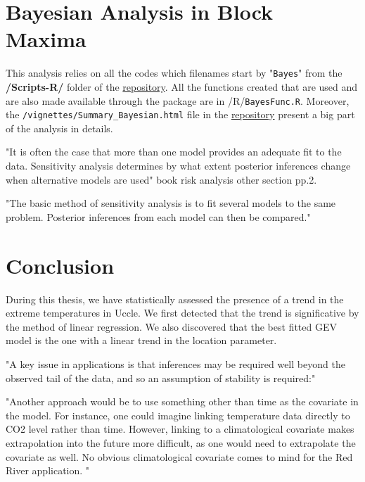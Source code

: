 \documentclass[11pt,a4paper,openany, twosided]{book}
\begin{document}
\chapter{Bayesian Analysis in Block Maxima}\label{sec:anabayes}
\minitoc \thispagestyle{empty}
 \vspace{1cm}

This analysis relies on all the codes which filenames start by "\texttt{Bayes}" from the \textbf{/Scripts-R/} folder of the \href{https://github.com/proto4426/PissoortThesis/}{repository}. All the functions created that are used and are also made available through the package are in /R/\texttt{BayesFunc.R}. Moreover,
the \texttt{/vignettes/Summary\_Bayesian.html} file in the \href{https://github.com/proto4426/PissoortThesis/}{repository} present a big part of the analysis in details.

"It is often the case that more than one model provides an adequate fit to the data. Sensitivity analysis determines by what extent posterior inferences change when alternative
models are used"   book risk analysis other section pp.2.

"The basic method of sensitivity analysis is to fit several models to
the same problem. Posterior inferences from each model can then be compared."







\chapter*{Conclusion}
\thispagestyle{empty}

During this thesis, we have statistically assessed the presence of a trend in the extreme temperatures in Uccle. We first detected that the trend is significative by the method of linear regression. We also discovered that the best fitted GEV model is the one with a linear trend in the location parameter.

"A key issue in applications is that inferences
may be required well beyond the observed tail of
the data, and so an assumption of stability is required:" \cite{davison_statistical_2012}

"Another approach would be to use something other than time as the covariate 
in the model. For instance, one could imagine linking temperature data directly to
CO2 level rather than time. However, linking to a climatological covariate makes
extrapolation into the future more difficult, as one would need to extrapolate the 
covariate as well. No obvious climatological covariate comes to mind for the Red
River application. " %
\end{document}
